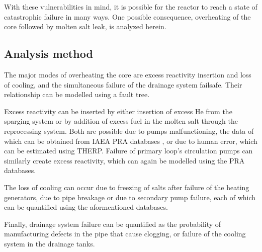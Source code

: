 \documentclass[12pt]{article}
\begin{document}
With these vulnerabilities in mind, it is possible for the reactor to reach a state of catastrophic failure in many ways. One possible consequence, overheating of the core followed by molten salt leak, is analyzed herein.

\subsection{Analysis method}

The major modes of overheating the core are excess reactivity insertion and loss of cooling, and the simultaneous failure of the drainage system failsafe. Their relationship can be modelled using a fault tree.

Excess reactivity can be inserted by either insertion of excess He from the sparging system or by addition of excess fuel in the molten salt through the reprocessing system. Both are possible due to pumps malfunctioning, the data of which can be obtained from IAEA PRA databases \cite{iaea_component_1988}, or due to human error, which can be estimated using THERP. Failure of primary loop's circulation pumps can similarly create excess reactivity, which can again be modelled using the PRA databases.

The loss of cooling can occur due to freezing of salts after failure of the heating generators, due to pipe breakage or due to secondary pump failure, each of which can be quantified using the aformentioned databases.

Finally, drainage system failure can be quantified as the probability of manufacturing defects in the pipe that cause clogging, or failure of the cooling system in the drainage tanks.




\end{document}
